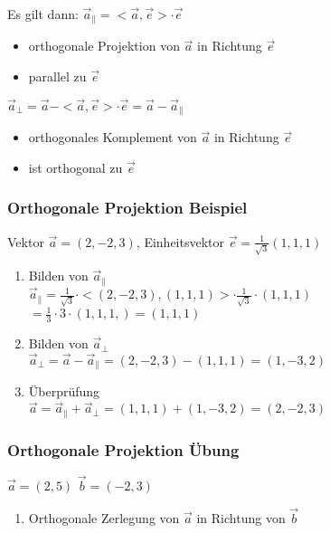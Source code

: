 \begin{frame}
    \vfill Es gilt dann:
    \vfill $\vec{a}_{\parallel} = < \vec{a}, \vec{e}> \cdot \vec{e}$ \\
    \begin{itemize}
        \item orthogonale Projektion von $\vec{a}$ in Richtung $\vec{e}$
        \item parallel zu $\vec{e}$
    \end{itemize}

    \vfill$\vec{a}_{\perp} = \vec{a} - <\vec{a}, \vec{e}> \cdot \vec{e} = \vec{a} - \vec{a}_{\parallel}$
    \begin{itemize}
        \item orthogonales Komplement von $\vec{a}$ in Richtung $\vec{e}$
        \item ist orthogonal zu $\vec{e}$
    \end{itemize}
\end{frame}

\begin{frame}
    \frametitle{Orthogonale Projektion Beispiel}
    Vektor $\vec{a} = (2, -2, 3)$, Einheitsvektor $\vec{e} = \frac{1}{\sqrt{3}}(1, 1, 1)$\\

    \begin{enumerate}
        \item Bilden von $\vec{a}_{\parallel}$\\
        $\vec{a}_{\parallel} = \frac{1}{\sqrt{3}} \cdot <(2, -2, 3), (1, 1, 1)> \cdot \frac{1}{\sqrt{3}} \cdot (1, 1, 1)$
        $= \frac{1}{3} \cdot 3 \cdot (1, 1, 1,) = (1, 1, 1)$
        \item Bilden von $\vec{a}_{\perp}$\\
        $\vec{a}_{\perp} = \vec{a} - \vec{a}_{\parallel} = (2, -2, 3) - (1, 1, 1) = (1, -3 , 2)$
        \item Überprüfung\\
        $\vec{a} = \vec{a}_{\parallel} + \vec{a}_{\perp} = (1, 1, 1) + (1, -3, 2) = (2, -2, 3)$
    \end{enumerate}
\end{frame}


\begin{frame}
    \frametitle{Orthogonale Projektion Übung}
    $\vec{a} = (2, 5)$ $\vec{b} = (-2, 3)$\\
    \begin{enumerate}
        \item Orthogonale Zerlegung von $\vec{a}$ in Richtung von $\vec{b}$
    \end{enumerate}
\end{frame}


